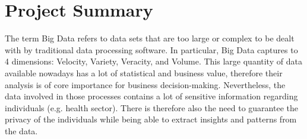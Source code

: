 \documentclass[12pt]{article}
\begin{document}


\section{Project Summary}
The term Big Data refers to data sets that are too large or complex to be dealt with by traditional data processing software. 
In particular, Big Data captures to 4 dimensions: Velocity, Variety, Veracity, and Volume. This large quantity of data available nowadays has 
a lot of statistical and business value, therefore their analysis is of core importance for business decision-making. Nevertheless, the data 
involved in those processes contains a lot of sensitive information regarding individuals (e.g. health sector). There is therefore also the need to 
guarantee the privacy of the individuals while being able to extract insights and patterns from the data. 
\end{document}
